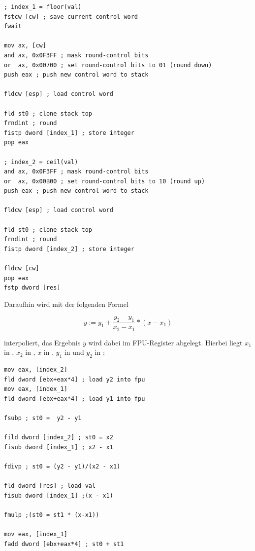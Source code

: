 \documentclass{article}
\begin{document}
\begin{lstlisting}
; index_1 = floor(val)
fstcw [cw] ; save current control word
fwait

mov ax, [cw]
and ax, 0x0F3FF ; mask round-control bits
or  ax, 0x00700 ; set round-control bits to 01 (round down)
push eax ; push new control word to stack

fldcw [esp] ; load control word

fld st0 ; clone stack top
frndint ; round
fistp dword [index_1] ; store integer
pop eax

; index_2 = ceil(val)
and ax, 0x0F3FF ; mask round-control bits
or  ax, 0x00B00 ; set round-control bits to 10 (round up)
push eax ; push new control word to stack

fldcw [esp] ; load control word

fld st0 ; clone stack top
frndint ; round
fistp dword [index_2] ; store integer

fldcw [cw]
pop eax
fstp dword [res]
\end{lstlisting}

\vspace{0.5cm}

	Daraufhin wird mit der folgenden Formel

	\[y:=y_1+\frac{y_2-y_1}{x_2-x_1}*(x-x_1)\]

	interpoliert, das Ergebnis \(y\) wird dabei im FPU-Register  abgelegt.
	Hierbei
	liegt \(x_1\) in \codeword{[index_1]}, \(x_2\) in \codeword{[index_2]},
	\(x\) in , \(y_1\) in  und
	\(y_2\) in :

\vspace{0.5cm}

\begin{lstlisting}
mov eax, [index_2]
fld dword [ebx+eax*4] ; load y2 into fpu
mov eax, [index_1]
fld dword [ebx+eax*4] ; load y1 into fpu

fsubp ; st0 =  y2 - y1

fild dword [index_2] ; st0 = x2
fisub dword [index_1] ; x2 - x1

fdivp ; st0 = (y2 - y1)/(x2 - x1)

fld dword [res] ; load val
fisub dword [index_1] ;(x - x1)

fmulp ;(st0 = st1 * (x-x1))

mov eax, [index_1]
fadd dword [ebx+eax*4] ; st0 + st1
\end{lstlisting}

\vspace{0.5cm}
\end{document}
